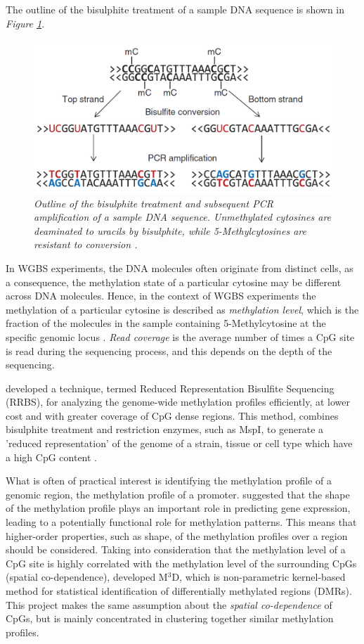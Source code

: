 The outline of the bisulphite treatment of a sample DNA sequence is shown in \emph{Figure \ref{bisulphite-pic}}.
\begin{figure}[!ht]
	\begin{center}
 		\includegraphics[scale = 0.43]{images/bis-treatment.png}
		\caption{\emph{Outline of the bisulphite treatment and subsequent PCR amplification of a sample DNA sequence. Unmethylated cytosines are deaminated to uracils by bisulphite, while 5-Methylcytosines are resistant to conversion \citep{Krueger2012}.}}
		\label{bisulphite-pic}
	\end{center}
\end{figure} 
In WGBS experiments, the DNA molecules often originate from distinct cells, as a consequence, the methylation state of a particular cytosine may be different across DNA molecules. Hence, in the context of WGBS experiments the methylation of a particular cytosine is described as \emph{methylation level}, which is the fraction of the molecules in the sample containing 5-Methylcytosine at the specific genomic locus \citep{Schultz2012}. \emph{Read coverage} is the average number of times a CpG site is read during the sequencing process, and this depends on the depth of the sequencing.

\cite{Meissner2005} developed a technique, termed Reduced Representation Bisulfite Sequencing (RRBS), for analyzing the genome-wide methylation profiles efficiently, at lower cost and with greater coverage of CpG dense regions. This method, combines bisulphite treatment and restriction enzymes, such as MspI, to generate a 'reduced representation' of the genome of a strain, tissue or cell type which have a high CpG content \citep{Meissner2005}. 

What is often of practical interest is identifying the methylation profile of a genomic region, \eg the methylation profile of a promoter. \cite{Vanderkraats2013} suggested that the shape of the methylation profile plays an important role in predicting gene expression, leading to a potentially functional role for methylation patterns. This means that higher-order properties, such as shape, of the methylation profiles over a region should be considered. Taking into consideration that the methylation level of a CpG site is highly correlated with the methylation level of the surrounding CpGs (\ie spatial co-dependence), \cite{Mayo2014} developed M$^3$D, which is non-parametric kernel-based method for statistical identification of differentially methylated regions (DMRs). This project makes the same assumption about the \emph{spatial co-dependence} of CpGs, but is mainly concentrated in clustering together similar methylation profiles.